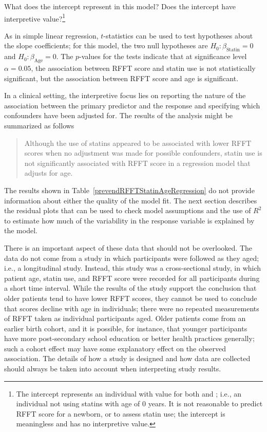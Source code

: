 \begin{exercise} What does the intercept represent in this model? Does the intercept have interpretive value?\footnote{The intercept represents an individual with value  for both  and ; i.e., an individual not using statins with age of 0 years. It is not reasonable to predict RFFT score for a newborn, or to assess statin use; the intercept is meaningless and has no interpretive value.}
\end{exercise}

As in simple linear regression, $t$-statistics can be used to test hypotheses about the slope coefficients; for this model, the two null hypotheses are $H_0: \beta_{\text{Statin}} = 0$ and $H_0: \beta_{\text{Age}} = 0$. The $p$-values for the tests indicate that at significance level $\alpha = 0.05$, the association between RFFT score and statin use is not statistically significant, but the association between RFFT score and age is significant. 

In a clinical setting, the interpretive focus lies on reporting the nature of the association between the primary predictor and the response and specifying which confounders have been adjusted for. The results of the analysis might be summarized as follows\textemdash
\begin{quotation}
	Although the use of statins appeared to be associated with lower RFFT scores when no adjustment was made for possible confounders, statin use is not significantly associated with RFFT score in a regression model that adjusts for age. 
\end{quotation}

The results shown in Table~\ref{prevendRFFTStatinAgeRegression} do not provide information about either the quality of the model fit. The next section describes the residual plots that can be used to check model assumptions and the use of $R^2$ to estimate how much of the variability in the response variable is explained by the model.

There is an important aspect of these data that should not be overlooked. The data do not come from a study in which participants were followed as they aged; i.e., a longitudinal study. Instead, this study was a cross-sectional study, in which patient age, statin use, and RFFT score were recorded for all participants during a short time interval. While the results of the study support the conclusion that older patients tend to have lower RFFT scores, they cannot be used to conclude that scores decline with age in individuals; there were no repeated measurements of RFFT taken as individual participants aged. Older patients come from an earlier birth cohort, and it is possible, for instance, that younger participants have more post-secondary school education or better health practices generally; such a cohort effect may have some explanatory effect on the observed association. The details of how a study is designed and how data are collected should always be taken into account when interpreting study results. 

